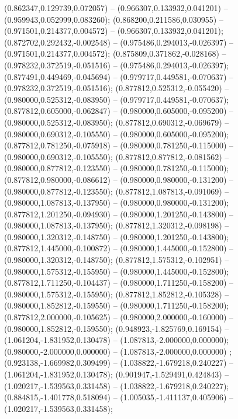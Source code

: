  (0.862347,0.129739,0.072057) -- (0.966307,0.133932,0.041201) -- (0.959943,0.052999,0.083260);
 (0.868200,0.211586,0.030955) -- (0.971501,0.214377,0.004572) -- (0.966307,0.133932,0.041201);
 (0.872702,0.292432,-0.002548) -- (0.975486,0.294013,-0.026397) -- (0.971501,0.214377,0.004572);
 (0.875809,0.371862,-0.028168) -- (0.978232,0.372519,-0.051516) -- (0.975486,0.294013,-0.026397);
 (0.877491,0.449469,-0.045694) -- (0.979717,0.449581,-0.070637) -- (0.978232,0.372519,-0.051516);
 (0.877812,0.525312,-0.055420) -- (0.980000,0.525312,-0.083950) -- (0.979717,0.449581,-0.070637);
 (0.877812,0.605000,-0.062847) -- (0.980000,0.605000,-0.095200) -- (0.980000,0.525312,-0.083950);
 (0.877812,0.690312,-0.069679) -- (0.980000,0.690312,-0.105550) -- (0.980000,0.605000,-0.095200);
 (0.877812,0.781250,-0.075918) -- (0.980000,0.781250,-0.115000) -- (0.980000,0.690312,-0.105550);
 (0.877812,0.877812,-0.081562) -- (0.980000,0.877812,-0.123550) -- (0.980000,0.781250,-0.115000);
 (0.877812,0.980000,-0.086612) -- (0.980000,0.980000,-0.131200) -- (0.980000,0.877812,-0.123550);
 (0.877812,1.087813,-0.091069) -- (0.980000,1.087813,-0.137950) -- (0.980000,0.980000,-0.131200);
 (0.877812,1.201250,-0.094930) -- (0.980000,1.201250,-0.143800) -- (0.980000,1.087813,-0.137950);
 (0.877812,1.320312,-0.098198) -- (0.980000,1.320312,-0.148750) -- (0.980000,1.201250,-0.143800);
 (0.877812,1.445000,-0.100872) -- (0.980000,1.445000,-0.152800) -- (0.980000,1.320312,-0.148750);
 (0.877812,1.575312,-0.102951) -- (0.980000,1.575312,-0.155950) -- (0.980000,1.445000,-0.152800);
 (0.877812,1.711250,-0.104437) -- (0.980000,1.711250,-0.158200) -- (0.980000,1.575312,-0.155950);
 (0.877812,1.852812,-0.105328) -- (0.980000,1.852812,-0.159550) -- (0.980000,1.711250,-0.158200);
 (0.877812,2.000000,-0.105625) -- (0.980000,2.000000,-0.160000) -- (0.980000,1.852812,-0.159550);
 (0.948923,-1.825769,0.169154) -- (1.061204,-1.831952,0.130478) -- (1.087813,-2.000000,0.000000);
 (0.980000,-2.000000,0.000000) -- (1.087813,-2.000000,0.000000) ;
 (0.923138,-1.669982,0.309499) -- (1.038822,-1.679218,0.240227) -- (1.061204,-1.831952,0.130478);
 (0.901947,-1.529491,0.424843) -- (1.020217,-1.539563,0.331458) -- (1.038822,-1.679218,0.240227);
 (0.884815,-1.401778,0.518094) -- (1.005035,-1.411137,0.405906) -- (1.020217,-1.539563,0.331458);
